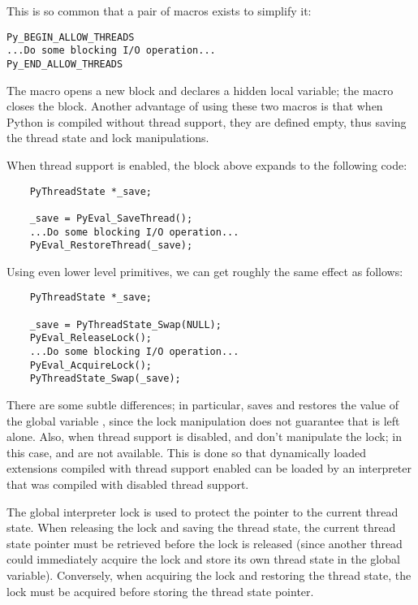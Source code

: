 This is so common that a pair of macros exists to simplify it:

\begin{verbatim}
Py_BEGIN_ALLOW_THREADS
...Do some blocking I/O operation...
Py_END_ALLOW_THREADS
\end{verbatim}

The
macro opens a new block and declares a hidden local variable; the
macro closes the block.  Another advantage of using these two macros
is that when Python is compiled without thread support, they are
defined empty, thus saving the thread state and lock manipulations.

When thread support is enabled, the block above expands to the
following code:

\begin{verbatim}
    PyThreadState *_save;

    _save = PyEval_SaveThread();
    ...Do some blocking I/O operation...
    PyEval_RestoreThread(_save);
\end{verbatim}

Using even lower level primitives, we can get roughly the same effect
as follows:

\begin{verbatim}
    PyThreadState *_save;

    _save = PyThreadState_Swap(NULL);
    PyEval_ReleaseLock();
    ...Do some blocking I/O operation...
    PyEval_AcquireLock();
    PyThreadState_Swap(_save);
\end{verbatim}

There are some subtle differences; in particular,
 saves
and restores the value of the  global variable
, since the lock manipulation does not
guarantee that  is left alone.  Also, when thread support
is disabled,
 and
 don't manipulate the lock; in this
case,  and
 are not
available.  This is done so that dynamically loaded extensions
compiled with thread support enabled can be loaded by an interpreter
that was compiled with disabled thread support.

The global interpreter lock is used to protect the pointer to the
current thread state.  When releasing the lock and saving the thread
state, the current thread state pointer must be retrieved before the
lock is released (since another thread could immediately acquire the
lock and store its own thread state in the global variable).
Conversely, when acquiring the lock and restoring the thread state,
the lock must be acquired before storing the thread state pointer.

